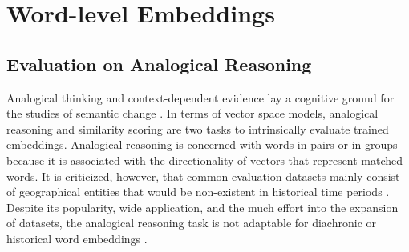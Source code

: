 \begin{exe}
\end{exe}

\section{Word-level Embeddings}
\subsection{Evaluation on Analogical Reasoning}
Analogical thinking and context-dependent evidence lay a cognitive ground for the studies of semantic change \parencite{traugott2017semantic}. In terms of vector space models, analogical reasoning and similarity scoring are two tasks to intrinsically evaluate trained embeddings. Analogical reasoning is concerned with words in pairs or in groups because it is associated with the directionality of vectors that represent matched words. It is criticized, however, that common evaluation datasets mainly consist of geographical entities that would be non-existent in historical time periods \parencite{wevers2020digital,li2018analogical}. Despite its popularity, wide application, and the much effort into the expansion of datasets, the analogical reasoning task is not adaptable for diachronic or historical word embeddings \parencite{wevers2020digital}.

